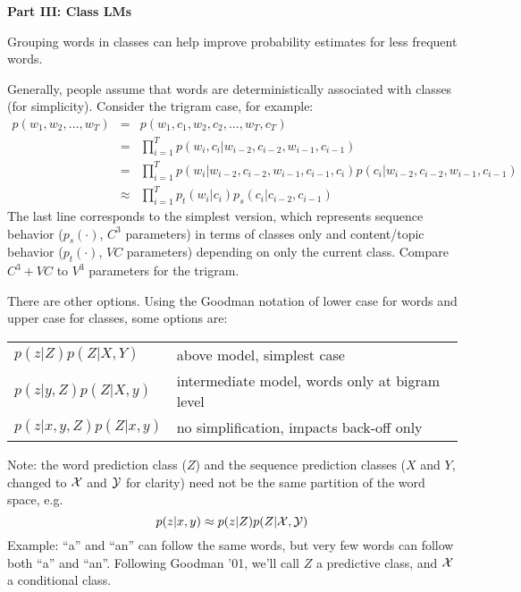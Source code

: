 \documentclass[11pt,titlepage]{article}
\begin{document}
\clearpage 

\centerline{{\huge \bf Part III: Class LMs}}
\vskip 0.1in

Grouping words in classes can help improve probability estimates
for less frequent words.

Generally, people assume that words are deterministically associated
with classes (for simplicity).  Consider the trigram case, for example:
{\Large
\begin{eqnarray*}
p(w_1, w_2, \ldots , w_T) & = & p(w_1,c_1,w_2, c_2, \ldots , w_T, c_T)\\
 & = &  \prod_{i=1}^T p(w_i,c_i|w_{i-2},c_{i-2},w_{i-1},c_{i-1})\\
 & = &  \prod_{i=1}^T p(w_i|w_{i-2},c_{i-2},w_{i-1},c_{i-1},c_i)p(c_i|w_{i-2},c_{i-2},w_{i-1},c_{i-1})\\
 & \approx &  \prod_{i=1}^T p_t(w_i|c_i)p_s(c_i|c_{i-2},c_{i-1})
\end{eqnarray*}
}
The last line corresponds to the simplest version, which represents
sequence behavior ($p_s(\cdot)$, $C^3$ parameters) in terms of classes only and
content/topic behavior ($p_t(\cdot)$, $VC$ parameters) depending on only 
the current class. Compare $C^3+VC$ to $V^3$ parameters for the trigram.

\vskip 0.1in

There are other options.  Using the Goodman notation of lower case for 
words and upper case for classes, some options are:
\begin{center}
\begin{tabular}{ll}
$p(z|Z)p(Z|X,Y)$ & above model, simplest case \\
$p(z|y,Z)p(Z|X,y)$ & intermediate model, words only at bigram level \\
$p(z|x,y,Z)p(Z|x,y)$ & no simplification, impacts back-off only \\
\end{tabular}
\end{center}

\vskip 0.1in
Note: the word prediction class ($Z$) and the sequence prediction classes ($X$ and $Y$, changed to ${\cal X}$ and ${\cal Y}$ for clarity) need not be the same partition of the word space, e.g.
$$p(z|x,y) \approx p(z|Z)p(Z|{\cal X},{\cal Y})$$
{\Large Example: ``a'' and ``an'' can follow the same words, but very few words can follow both ``a'' and ``an''.  Following Goodman '01, we'll call $Z$ a predictive class, and ${\cal X}$ a conditional class.}
\end{document}
